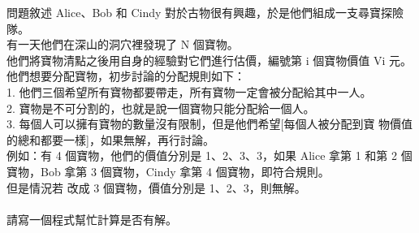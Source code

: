 問題敘述 Alice、Bob 和 Cindy 對於古物很有興趣，於是他們組成一支尋寶探險隊。\\
有一天他們在深山的洞穴裡發現了 N 個寶物。\\
他們將寶物清點之後用自身的經驗對它們進行估價，編號第 i 個寶物價值 Vi 元。\\
他們想要分配寶物，初步討論的分配規則如下：\\
1. 他們三個希望所有寶物都要帶走，所有寶物一定會被分配給其中一人。\\
2. 寶物是不可分割的，也就是說一個寶物只能分配給一個人。\\
3. 每個人可以擁有寶物的數量沒有限制，但是他們希望[每個人被分配到寶 物價值的總和都要一樣]，如果無解，再行討論。\\
   例如：有 4 個寶物，他們的價值分別是 1、2、3、3，如果 Alice 拿第 1 和第 2 個寶物，Bob 拿第 3 個寶物，Cindy 拿第 4 個寶物，即符合規則。\\
但是情況若 改成 3 個寶物，價值分別是 1、2、3，則無解。\\
\\
請寫一個程式幫忙計算是否有解。\\